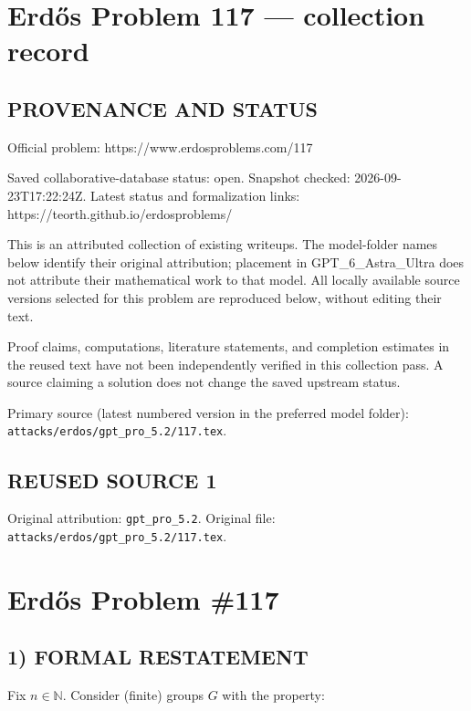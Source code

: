 \section*{Erd\H{o}s Problem 117 --- collection record}

\subsection*{PROVENANCE AND STATUS}
Official problem: https://www.erdosproblems.com/117

Saved collaborative-database status: open.
Snapshot checked: 2026-09-23T17:22:24Z.
Latest status and formalization links: https://teorth.github.io/erdosproblems/

This is an attributed collection of existing writeups. The model-folder names below identify their original attribution; placement in GPT\_6\_Astra\_Ultra does not attribute their mathematical work to that model. All locally available source versions selected for this problem are reproduced below, without editing their text.

Proof claims, computations, literature statements, and completion estimates in the reused text have not been independently verified in this collection pass. A source claiming a solution does not change the saved upstream status.

Primary source (latest numbered version in the preferred model folder): \texttt{attacks/erdos/gpt\_pro\_5.2/117.tex}.

\subsection*{REUSED SOURCE 1}
Original attribution: \texttt{gpt\_pro\_5.2}.
Original file: \texttt{attacks/erdos/gpt\_pro\_5.2/117.tex}.


\section*{Erd\H{o}s Problem \#117}

\subsection*{1) FORMAL RESTATEMENT}
Fix $n\in\mathbb N$.  Consider (finite) groups $G$ with the property:

